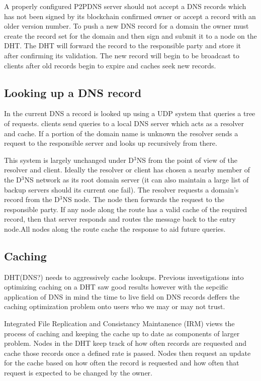\documentclass[11pt]{IEEEtran} %
\begin{document}
A properly configured P2PDNS server should not accept a DNS records which has not been signed by its blockchain confirmed owner or accept a record with an older version number. To push a new DNS record for a domain the owner must create the record set for the domain and then sign and submit it to a node on the DHT. The DHT will forward the record to the responsible party and store it after confirming its validation. The new record will begin to be broadcast to clients after old records begin to expire and caches seek new records.

\subsection{Looking up a DNS record}
In the current DNS a record is looked up using a UDP system that queries a tree of requests. clients send queries to a local DNS server which acts as a resolver and cache. If a portion of the domain name is unknown the resolver sends a request to the responsible server and looks up recursively from there.

This system is largely unchanged under D$^{3}$NS from the point of view of the resolver and client. Ideally the resolver or client has chosen a nearby member of the D$^{3}$NS network as its root domain server (it can also maintain a large list of backup servers should its current one fail). The resolver requests a domain’s record from the D$^{3}$NS node. The node then forwards the request to the responsible party. If any node along the route has a valid cache of the required record, then that server responds and routes the message back to the entry node.All nodes along the route cache the response to aid future queries.

\subsection{Caching}
DHT(DNS?) needs to aggressively cache lookups. Previous investigations into optimizing caching on a DHT saw good results \cite{irm} however with the sepcific application of DNS in mind the time to live field on DNS records deffers the caching optimization problem onto users who we may or may not trust.

Integrated File Replication and Consistancy Maintanence (IRM) \cite{irm} views the process of caching and keeping the cache up to date as components of larger problem.  Nodes in the DHT keep track of how often records are requested and cache those records once a defined rate is passed.  Nodes then request an update for the cache based on how often the record is requested and how often that request is expected to be changed by the owner.
\end{document}
